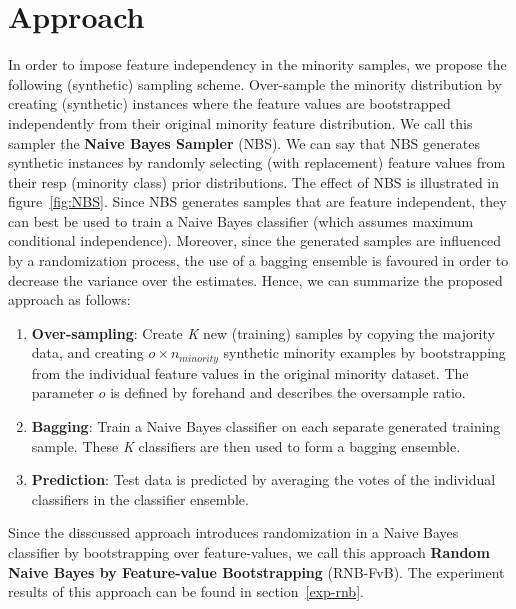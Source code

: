\section{Approach}\label{rnb-approach}
In order to impose feature independency in the minority samples, we propose the following (synthetic) sampling scheme. Over-sample the minority distribution by creating (synthetic) instances where the feature values are bootstrapped independently from their original minority feature distribution. We call this sampler the \textbf{Naive Bayes Sampler} (NBS). We can say that NBS generates synthetic instances by randomly selecting (with replacement) feature values from their resp (minority class) prior distributions. The effect of NBS is illustrated in figure~\ref{fig:NBS}. Since NBS generates samples that are feature independent, they can best be used to train a Naive Bayes classifier (which assumes maximum conditional independence). Moreover, since the generated samples are influenced by a randomization process, the use of a bagging ensemble is favoured in order to decrease the variance over the estimates. Hence, we can summarize the proposed approach as follows:


\begin{enumerate}
\item \textbf{Over-sampling}: Create \textit{K} new (training) samples by copying the majority data, and creating \(o \times n_{minority}\) synthetic minority examples by bootstrapping from the individual feature values in the original minority dataset. The parameter \(o\) is defined by forehand and describes the oversample ratio.
\item \textbf{Bagging}: Train a Naive Bayes classifier on each separate generated training sample. These \textit{K} classifiers are then used to form a bagging ensemble.
\item \textbf{Prediction}: Test data is predicted by averaging the votes of the individual classifiers in the classifier ensemble.
\end{enumerate}

Since the disscussed approach introduces randomization in a Naive Bayes classifier by bootstrapping over feature-values, we call this approach \textbf{Random Naive Bayes by Feature-value Bootstrapping} (RNB-FvB). The experiment results of this approach can be found in section~\ref{exp-rnb}.







